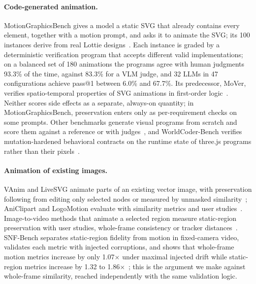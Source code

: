 \documentclass[11pt]{article}
\begin{document}
\paragraph{Code-generated animation.} MotionGraphicsBench gives a model a static SVG that already contains every element, together with a motion prompt, and asks it to animate the SVG; its 100 instances derive from real Lottie designs~\citep{ma2026motiongraphicsbench}. Each instance is graded by a deterministic verification program that accepts different valid implementations; on a balanced set of 180 animations the programs agree with human judgments 93.3\% of the time, against 83.3\% for a VLM judge, and 32 LLMs in 47 configurations achieve pass@1 between 6.0\% and 67.7\%. Its predecessor, MoVer, verifies spatio-temporal properties of SVG animations in first-order logic~\citep{ma2025mover}. Neither scores side effects as a separate, always-on quantity; in MotionGraphicsBench, preservation enters only as per-requirement checks on some prompts. Other benchmarks generate visual programs from scratch and score them against a reference or with judges~\citep{si2025design2code,wu2024plot2code,yang2024chartmimic,zhang2025artifactsbench,zhang2026animwebbench,diao2026vibevideobench}, and WorldCoder-Bench verifies mutation-hardened behavioral contracts on the runtime state of three.js programs rather than their pixels~\citep{lu2026worldcoderbench}.

\paragraph{Animation of existing images.} VAnim and LiveSVG animate parts of an existing vector image, with preservation following from editing only selected nodes or measured by unmasked similarity~\citep{liang2026vanim,levy2026livesvg}; AniClipart and LogoMotion evaluate with similarity metrics and user studies~\citep{wu2024aniclipart,liu2024logomotion}. Image-to-video methods that animate a selected region measure static-region preservation with user studies, whole-frame consistency or tracker distances~\citep{ma2024followyourclick,singer2025timetomove}. SNF-Bench separates static-region fidelity from motion in fixed-camera video, validates each metric with injected corruptions, and shows that whole-frame motion metrics increase by only 1.07$\times$ under maximal injected drift while static-region metrics increase by 1.32 to 1.86$\times$~\citep{minar2026snfbench}; this is the argument we make against whole-frame similarity, reached independently with the same validation logic.
\end{document}

